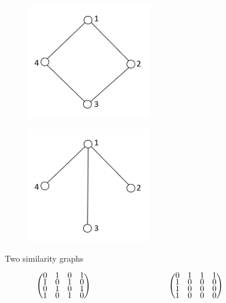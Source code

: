 \begin{figure}[h!]
  \centering
  \begin{subfigure}{0.4\textwidth}
    \centering
    \includegraphics[width = 0.6\textwidth]{adj_square.png}
  \end{subfigure}
  \begin{subfigure}{0.4\textwidth}
    \centering
    \includegraphics[width = 0.6\textwidth]{adj_tree.png}
  \end{subfigure}
  \caption{Two similarity graphs}
  \label{fig:sim_graphs}
\end{figure}

\begin{equation}
\label{eq:adj_mat}
\renewcommand*{\arraystretch}{.5}
  \begin{pmatrix}
    0 & 1 & 0 & 1 \\
    1 & 0 & 1 & 0 \\
    0 & 1 & 0 & 1 \\
    1 & 0 & 1 & 0 
    \end{pmatrix}
\hspace{1.3in}
\renewcommand*{\arraystretch}{.5}
  \begin{pmatrix}
    0 & 1 & 1 & 1 \\
    1 & 0 & 0 & 0 \\
    1 & 0 & 0 & 0 \\
    1 & 0 & 0 & 0 
    \end{pmatrix}
\end{equation}

